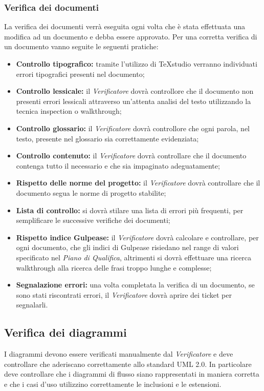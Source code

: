 \subsubsection{Verifica dei documenti}

La verifica dei documenti verrà eseguita ogni volta che è stata effettuata una modifica ad un documento e debba essere approvato.
Per una corretta verifica di un documento vanno seguite le seguenti pratiche:

\begin{itemize}
	\item \textbf{Controllo tipografico: }tramite l'utilizzo di TeXstudio verranno individuati errori tipografici presenti nel documento;
	\item \textbf{Controllo lessicale: }il \textit{Verificatore} dovrà controllore che il documento non presenti errori lessicali attraverso un'attenta analisi del testo utilizzando la tecnica inspection o walkthrough;
	\item \textbf{Controllo glossario: }il \textit{Verificatore} dovrà controllore che ogni parola, nel testo, presente nel glossario sia correttamente evidenziata;
	\item \textbf{Controllo contenuto: }il \textit{Verificatore} dovrà controllare che il documento contenga tutto il necessario e che sia impaginato adeguatamente;
	\item \textbf{Rispetto delle norme del progetto: }il \textit{Verificatore} dovrà controllare che il documento segua le norme di progetto stabilite;
	\item \textbf{Lista di controllo: }si dovrà stilare una lista di errori più frequenti, per semplificare le successive verifiche dei documenti;
	\item \textbf{Rispetto indice Gulpease: }il \textit{Verificatore} dovrà calcolare e controllare, per ogni documento, che gli indici di Gulpease risiedano nel range di valori specificato nel \textit{Piano di Qualifica}, altrimenti si dovrà effettuare una ricerca walkthrough alla ricerca delle frasi troppo lunghe e complesse;
	\item \textbf{Segnalazione errori: }una volta completata la verifica di un documento, se sono stati riscontrati errori, il \textit{Verificatore} dovrà aprire dei ticket per segnalarli.
\end{itemize}

\subsection{Verifica dei diagrammi}

I diagrammi devono essere verificati manualmente dal \textit{Verificatore} e deve controllare che aderiscano correttamente allo standard UML 2.0.
In particolare deve controllare che i diagrammi di flusso siano rappresentati in maniera corretta e che i casi d'uso utilizzino correttamente le inclusioni e le estensioni.